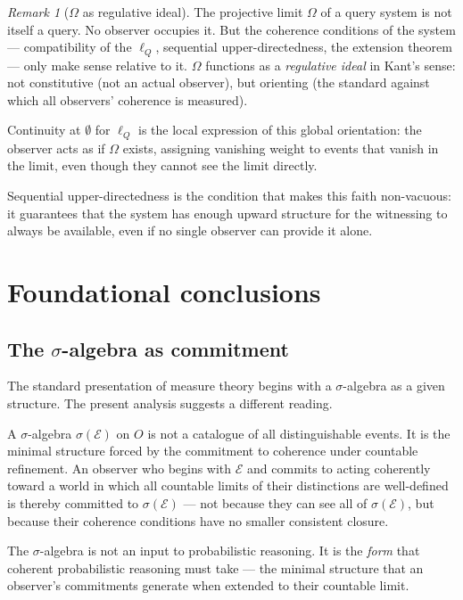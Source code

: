 \documentclass[12pt]{article}
\theoremstyle{definition}
\theoremstyle{remark}
\newtheorem{remark}[theorem]{Remark}
\newcommand{\E}{\mathcal{E}}
\newcommand{\sigE}{\sigma(\mathcal{E})}
\begin{document}
\begin{remark}[$\Omega$ as regulative ideal]
\label{rem:omega-regulative}
The projective limit $\Omega$ of a query system is not itself a query.  No
observer occupies it.  But the coherence conditions of the system --- compatibility
of the $\ell_Q$, sequential upper-directedness, the extension theorem --- only make
sense relative to it.  $\Omega$ functions as a \emph{regulative ideal} in Kant's
sense: not constitutive (not an actual observer), but orienting (the standard against
which all observers' coherence is measured).

Continuity at $\emptyset$ for $\ell_Q$ is the local expression of this global
orientation: the observer acts as if $\Omega$ exists, assigning vanishing weight to
events that vanish in the limit, even though they cannot see the limit directly.

Sequential upper-directedness is the condition that makes this faith non-vacuous:
it guarantees that the system has enough upward structure for the witnessing to always
be available, even if no single observer can provide it alone.
\end{remark}

\section{Foundational conclusions}
\label{sec:grounding}

\subsection{The $\sigma$-algebra as commitment}

The standard presentation of measure theory begins with a $\sigma$-algebra as a
given structure.  The present analysis suggests a different reading.

A $\sigma$-algebra $\sigE$ on $O$ is not a catalogue of all distinguishable events.
It is the minimal structure forced by the commitment to coherence under countable
refinement.  An observer who begins with $\E$ and commits to acting coherently
toward a world in which all countable limits of their distinctions are well-defined
is thereby committed to $\sigE$ --- not because they can see all of $\sigE$, but
because their coherence conditions have no smaller consistent closure.

The $\sigma$-algebra is not an input to probabilistic reasoning.  It is the
\emph{form} that coherent probabilistic reasoning must take --- the minimal structure
that an observer's commitments generate when extended to their countable limit.
\end{document}
